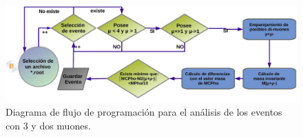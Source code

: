 \begin{figure}[ht]
\centering
\includegraphics[width=1\textwidth]{Simulacion/imagenes/proceso_genera_darksusy2_.png}
\caption{Diagrama de flujo de programación para el análisis de los eventos con 3 y dos muones.}
\label{genera_darksusy}
\end{figure}